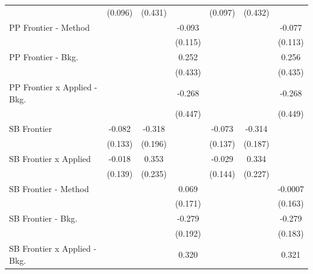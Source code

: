\begin{tabular}{lcccccc}
                                  & (0.096)        & (0.431)        &                & (0.097)        & (0.432)        &   \\   
   PP Frontier - Method           &                &                & -0.093         &                &                & -0.077\\   
                                  &                &                & (0.115)        &                &                & (0.113)\\   
   PP Frontier - Bkg.             &                &                & 0.252          &                &                & 0.256\\   
                                  &                &                & (0.433)        &                &                & (0.435)\\   
   PP Frontier x Applied - Bkg.   &                &                & -0.268         &                &                & -0.268\\   
                                  &                &                & (0.447)        &                &                & (0.449)\\   
   SB Frontier                    & -0.082         & -0.318         &                & -0.073         & -0.314         &   \\   
                                  & (0.133)        & (0.196)        &                & (0.137)        & (0.187)        &   \\   
   SB Frontier x Applied          & -0.018         & 0.353          &                & -0.029         & 0.334          &   \\   
                                  & (0.139)        & (0.235)        &                & (0.144)        & (0.227)        &   \\   
   SB Frontier - Method           &                &                & 0.069          &                &                & -0.0007\\   
                                  &                &                & (0.171)        &                &                & (0.163)\\   
   SB Frontier - Bkg.             &                &                & -0.279         &                &                & -0.279\\   
                                  &                &                & (0.192)        &                &                & (0.183)\\   
   SB Frontier x Applied - Bkg.   &                &                & 0.320          &                &                & 0.321\\   

\end{tabular}
